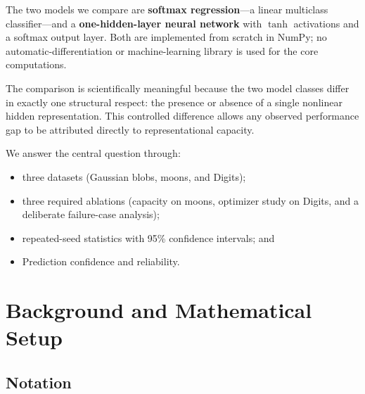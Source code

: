 \documentclass[11pt]{article}
\begin{document}
The two models we compare are \textbf{softmax regression}---a linear multiclass
classifier---and a \textbf{one-hidden-layer neural network} with $\tanh$
activations and a softmax output layer.
Both are implemented from scratch in NumPy; no automatic-differentiation or
machine-learning library is used for the core computations.

The comparison is scientifically meaningful because the two model classes differ
in exactly one structural respect: the presence or absence of a single nonlinear
hidden representation.
This controlled difference allows any observed performance gap to be attributed
directly to representational capacity.

We answer the central question through:
\begin{itemize}[leftmargin=1.5em]
  \item three datasets (Gaussian blobs, moons, and Digits);
  \item three required ablations (capacity on moons, optimizer study on Digits,
        and a deliberate failure-case analysis);
  \item repeated-seed statistics with 95\% confidence intervals; and
  \item Prediction confidence and reliability.
\end{itemize}

\section{Background and Mathematical Setup}
\label{sec:background}

\subsection{Notation}
\end{document}
